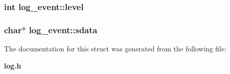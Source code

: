 \subsubsection[{level}]{\setlength{\rightskip}{0pt plus 5cm}int {\bf log\_\-event::level}}\label{structlog__event_5a2bad578daa5aa92109e61170c40b21}


\subsubsection[{sdata}]{\setlength{\rightskip}{0pt plus 5cm}char$\ast$ {\bf log\_\-event::sdata}}\label{structlog__event_de9f451913a0abbf38a6d88b25c6c767}




The documentation for this struct was generated from the following file:\begin{CompactItemize}
\item 
{\bf log.h}\end{CompactItemize}
